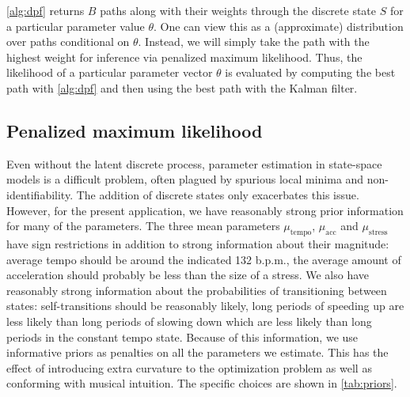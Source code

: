 \documentclass[aoas]{imsart}
\begin{document}
\autoref{alg:dpf} returns $B$ paths along with their weights through
the discrete state $S$ for a 
particular parameter value $\theta$. One
can view this as a (approximate) distribution over paths conditional
on $\theta$. Instead, we will simply take the path with the highest
weight for inference via penalized maximum likelihood. Thus, the
likelihood of a particular parameter vector $\theta$ is evaluated by
computing the best path with \autoref{alg:dpf} and then using the best
path with the Kalman filter.%

\subsection{Penalized maximum likelihood}
\label{sec:penal-maxim-likel}

Even without the latent discrete process, parameter estimation in
state-space models is a difficult problem, often plagued by spurious
local minima and non-identifiability. The addition of discrete states
only exacerbates this issue. However, for the present application, we
have reasonably strong prior information for many of the
parameters. The three mean parameters $\mu_{\textrm{tempo}}$,
$\mu_{\textrm{acc}}$ and $\mu_{\textrm{stress}}$ have sign
restrictions in addition to strong information about their magnitude:
average tempo should be around the indicated 132 b.p.m., the average
amount of acceleration should probably be less than the size of a
stress. We also have reasonably strong information about the
probabilities of transitioning between states: self-transitions should
be reasonably likely, long periods of speeding up are less likely than
long periods of slowing down which are less likely than long periods
in the constant tempo state. Because of this information, we use
informative priors as penalties on all the parameters we
estimate. This has the effect of introducing extra curvature to the
optimization problem as well as conforming with musical intuition. The
specific choices are shown in \autoref{tab:priors}. 
\end{document}

